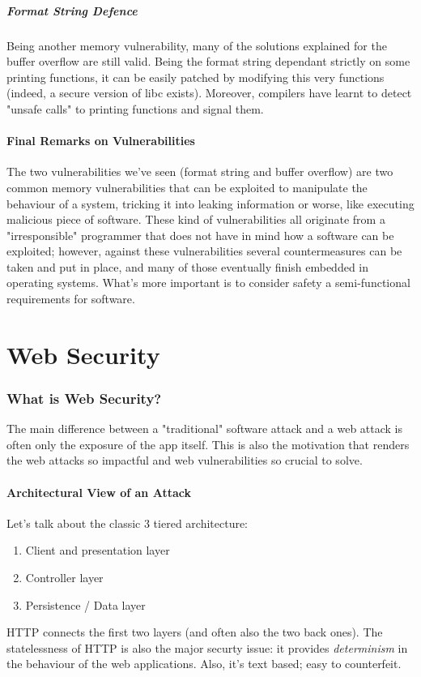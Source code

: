 \documentclass{article}
\begin{document}
				\subsubsection{Format String Defence}
					Being another memory vulnerability, many of the solutions explained for the buffer overflow are still valid. Being the format string dependant strictly on some printing functions, it can be easily patched by modifying this very functions (indeed, a secure version of libc exists). Moreover, compilers have learnt to detect "unsafe calls" to printing functions and signal them.
					
			\subsection{Final Remarks on Vulnerabilities}
				The two vulnerabilities we've seen (format string and buffer overflow) are two common memory vulnerabilities that can be exploited to manipulate the behaviour of a system, tricking it into leaking information or worse, like executing malicious piece of software. These kind of vulnerabilities all originate from a "irresponsible" programmer that does not have in mind how a software can be exploited; however, against these vulnerabilities several countermeasures can be taken and put in place, and many of those eventually finish embedded in operating systems. What's more important is to consider safety a semi-functional requirements for software.

	\clearpage \part{Web Security}
		\section{What is Web Security?}
			The main difference between a "traditional" software attack and a web attack is often only the exposure of the app itself. This is also the motivation that renders the web attacks so impactful and web vulnerabilities so crucial to solve.
			
			\subsection{Architectural View of an Attack}
				Let's talk about the classic 3 tiered architecture:
				\begin{enumerate}
					\item Client and presentation layer
					\item Controller layer
					\item Persistence / Data layer
				\end{enumerate}
				HTTP connects the first two layers (and often also the two back ones). The statelessness of HTTP is also the major securty issue: it provides \emph{determinism} in the behaviour of the web applications. Also, it's text based; easy to counterfeit. 
				
\end{document}
